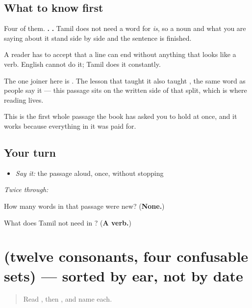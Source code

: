 \subsection*{What to know first}
Four of them. \textbf{ .} \textbf{ .} Tamil does not need a word for \emph{is}, so a noun and what you are saying about it stand side by side and the sentence is finished.

A reader has to accept that a line can end without anything that looks like a verb. English cannot do it; Tamil does it constantly.

The one joiner here is \textbf{}. The lesson that taught it also taught \textbf{}, the same word as people say it — this passage sits on the written side of that split, which is where reading lives.

This is the first whole passage the book has asked you to hold at once, and it works because everything in it was paid for.

\subsection*{Your turn}
\begin{itemize}
\raggedright
  \item \emph{Say it:} the passage aloud, once, without stopping
\end{itemize}

\emph{Twice through:}

\begin{tcolorbox}[breakable,colback=teal!4,colframe=teal!35!black,title={Before you move on}]
How many words in that passage were new? (\textbf{None.})

What does Tamil not need in \textbf{ }? (\textbf{A verb.})
\end{tcolorbox}
\section[(twelve consonants, four confusable …]{(twelve consonants, four confusable sets) — sorted by ear, not by date}

\label{lesson:TA-R84-letters-that-look-alike}



\begin{quote}
Read \textbf{}, then \textbf{}, and name each.
\end{quote}

